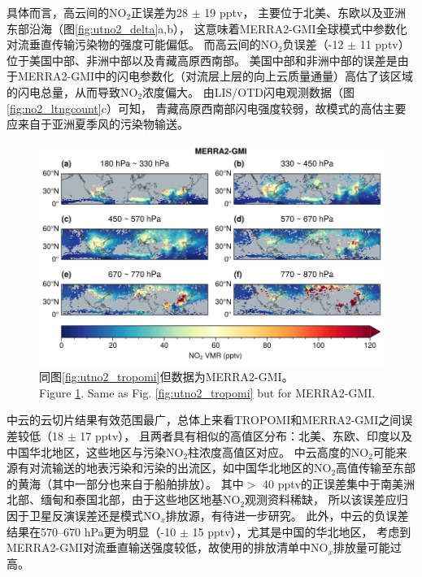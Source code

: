 具体而言，高云间的NO$_2$正误差为28 $\pm$ 19 pptv，
主要位于北美、东欧以及亚洲东部沿海（图\ref{fig:utno2_delta}a,b），
这意味着MERRA2-GMI全球模式中参数化对流垂直传输污染物的强度可能偏低。
而高云间的NO$_2$负误差（-12 $\pm$ 11 pptv）位于美国中部、非洲中部以及青藏高原西南部。
美国中部和非洲中部的误差是由于MERRA2-GMI中的闪电参数化（对流层上层的向上云质量通量）高估了该区域的闪电总量，从而导致NO$_2$浓度偏大\citep{Allen.2002,Allen.2010}。
由LIS/OTD闪电观测数据（图\ref{fig:no2_ltngcount}c）可知，
青藏高原西南部闪电强度较弱，故模式的高估主要应来自于亚洲夏季风的污染物输送。

\begin{figure}[H]
    \centering
    \includegraphics[width=13cm]{./figures/utno2_merra2-gmi.png}
    \caption{
    同图\ref{fig:utno2_tropomi}但数据为MERRA2-GMI。 \\
    Figure \ref{fig:utno2_merra2}. Same as Fig. \ref{fig:utno2_tropomi} but for MERRA2-GMI.
    }
    \label{fig:utno2_merra2}
\end{figure}

中云的云切片结果有效范围最广，总体上来看TROPOMI和MERRA2-GMI之间误差较低（18 $\pm$ 17 pptv），
且两者具有相似的高值区分布：北美、东欧、印度以及中国华北地区，这些地区与污染NO$_2$柱浓度高值区对应。
中云高度的NO$_2$可能来源有对流输送的地表污染和污染的出流区，如中国华北地区的NO$_2$高值传输至东部的黄海（其中一部分也来自于船舶排放）。
其中$>$ 40 pptv的正误差集中于南美洲北部、缅甸和泰国北部，由于这些地区地基NO$_2$观测资料稀缺，
所以该误差应归因于卫星反演误差还是模式NO$_x$排放源，有待进一步研究。
此外，中云的负误差结果在570--670 hPa更为明显（-10 $\pm$ 15 pptv），尤其是中国的华北地区，
考虑到MERRA2-GMI对流垂直输送强度较低，故使用的排放清单中NO$_x$排放量可能过高\citep{Ziemke.2019}。

